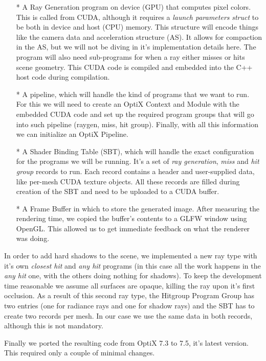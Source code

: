 \begin{itemize}
  \item[*]{A Ray Generation program on device (GPU) that computes pixel colors. This is called from CUDA, although it requires a \textit{launch parameters} \textit{struct} to be both in device and host (CPU) memory. This structure will encode things like the camera data and acceleration structure (AS). It allows for compaction in the AS, but we will not be diving in it's implementation details here. The program will also need sub-programs for when a ray either misses or hits scene geometry. This CUDA code is compiled and embedded into the C++ host code during compilation.}
  \item[*]{A pipeline, which will handle the kind of programs that we want to run. For this we will need to create an OptiX Context and Module with the embedded CUDA code and set up the required program groups that will go into such pipeline (raygen, miss, hit group). Finally, with all this information we can initialize an OptiX Pipeline.}
  \item[*]{A Shader Binding Table (SBT), which will handle the exact configuration for the programs we will be running. It's a set of \textit{ray generation}, \textit{miss} and \textit{hit group} records to run. Each record contains a header and user-supplied data, like per-mesh CUDA texture objects. All these records are filled during creation of the SBT and need to be uploaded to a CUDA buffer.}
  \item[*]{A Frame Buffer in which to store the generated image. After measuring the rendering time, we copied the buffer's contents to a GLFW window using OpenGL. This allowed us to get immediate feedback on what the renderer was doing.}
\end{itemize}

In order to add hard shadows to the scene, we implemented a new ray type with it's own \textit{closest hit} and \textit{any hit} programs (in this case all the work happens in the \textit{any hit} one, with the others doing nothing for shadows). To keep the development time reasonable we assume all surfaces are opaque, killing the ray upon it's first occlusion. As a result of this second ray type, the Hitgroup Program Group has two entries (one for radiance rays and one for shadow rays) and the SBT has to create two records per mesh. In our case we use the same data in both records, although this is not mandatory.

Finally we ported the resulting code from OptiX 7.3 to 7.5, it's latest version. This required only a couple of minimal changes.

